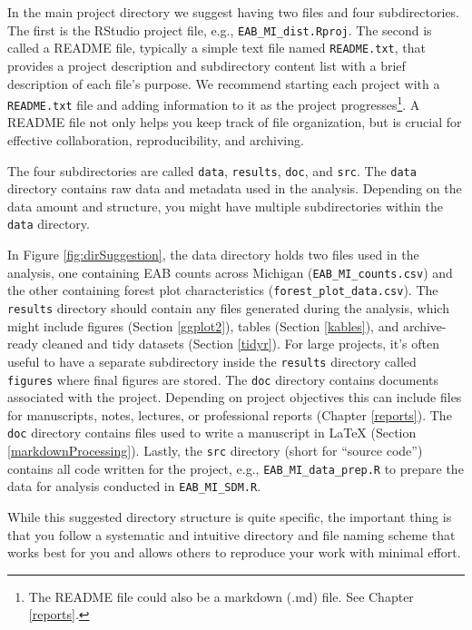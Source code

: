\documentclass[
  11pt,
]{krantz}
\theoremstyle{definition}
\theoremstyle{definition}
\theoremstyle{definition}
\theoremstyle{definition}
\theoremstyle{remark}
\begin{document}
In the main project directory we suggest having two files and four subdirectories. The first is the RStudio project file, e.g., \texttt{EAB\_MI\_dist.Rproj}. The second is called a README file, typically a simple text file named \texttt{README.txt}, that provides a project description and subdirectory content list with a brief description of each file's purpose. We recommend starting each project with a \texttt{README.txt} file and adding information to it as the project progresses\footnote{The README file could also be a markdown (.md) file. See Chapter \ref{reports}.}. A README file not only helps you keep track of file organization, but is crucial for effective collaboration, reproducibility, and archiving.

The four subdirectories are called \texttt{data}, \texttt{results}, \texttt{doc}, and \texttt{src}. The \texttt{data} directory contains raw data and metadata used in the analysis. Depending on the data amount and structure, you might have multiple subdirectories within the \texttt{data} directory.

In Figure \ref{fig:dirSuggestion}, the data directory holds two files used in the analysis, one containing EAB counts across Michigan (\texttt{EAB\_MI\_counts.csv}) and the other containing forest plot characteristics (\texttt{forest\_plot\_data.csv}). The \texttt{results} directory should contain any files generated during the analysis, which might include figures (Section \ref{ggplot2}), tables (Section \ref{kables}), and archive-ready cleaned and tidy datasets (Section \ref{tidyr}). For large projects, it's often useful to have a separate subdirectory inside the \texttt{results} directory called \texttt{figures} where final figures are stored. The \texttt{doc} directory contains documents associated with the project. Depending on project objectives this can include files for manuscripts, notes, lectures, or professional reports (Chapter \ref{reports}). The \texttt{doc} directory contains files used to write a manuscript in LaTeX (Section \ref{markdownProcessing}). Lastly, the \texttt{src} directory (short for ``source code'') contains all code written for the project, e.g., \texttt{EAB\_MI\_data\_prep.R} to prepare the data for analysis conducted in \texttt{EAB\_MI\_SDM.R}.

While this suggested directory structure is quite specific, the important thing is that you follow a systematic and intuitive directory and file naming scheme that works best for you and allows others to reproduce your work with minimal effort.
\end{document}
